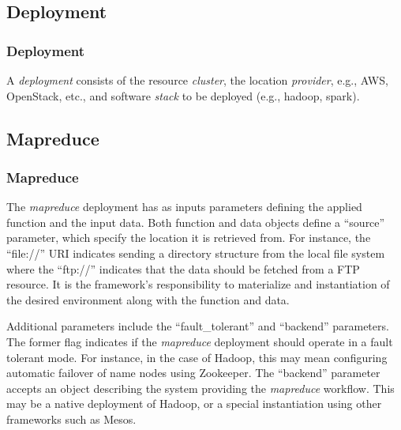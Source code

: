 \documentclass[10pt]{article}
\begin{document}
\subsection{Deployment}

\subsubsection{Deployment}

A \textit{deployment} consists of the resource \- \textit{cluster},
the location \- \textit{provider}, e.g., AWS, OpenStack, etc., and
software \textit{stack} to be deployed (e.g., hadoop, spark).


\subsection{Mapreduce}

\subsubsection{Mapreduce}

The \textit{mapreduce} deployment has as inputs parameters defining
the applied function and the input data.  Both function and data
objects define a ``source'' parameter, which specify the location it
is retrieved from. For instance, the ``file://'' URI indicates sending
a directory structure from the local file system where the ``ftp://''
indicates that the data should be fetched from a FTP resource. It is
the framework's responsibility to materialize and instantiation of the
desired environment along with the function and data.


Additional parameters include the ``fault\_tolerant'' and ``backend''
parameters.  The former flag indicates if the \textit{mapreduce}
deployment should operate in a fault tolerant mode. For instance, in
the case of Hadoop, this may mean configuring automatic failover of
name nodes using Zookeeper.  The ``backend'' parameter accepts an
object describing the system providing the \textit{mapreduce}
workflow.  This may be a native deployment of Hadoop, or a special
instantiation using other frameworks such as Mesos.
\end{document}
